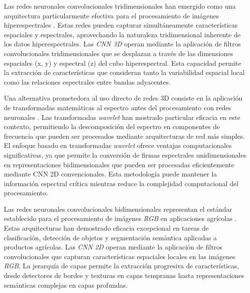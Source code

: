 \vspace{5mm}

Las redes neuronales convolucionales tridimensionales han emergido como una arquitectura particularmente efectiva para el procesamiento de imágenes hiperespectrales \cite{Zhong}. Estas redes pueden capturar simultáneamente características espaciales y espectrales, aprovechando la naturaleza tridimensional inherente de los datos hiperespectrales. Las \emph{CNN 3D} operan mediante la aplicación de filtros convolucionales tridimensionales que se desplazan a través de las dimensiones espaciales (x, y) y espectral (z) del cubo hiperespectral. Esta capacidad permite la extracción de características que consideran tanto la variabilidad espacial local como las relaciones espectrales entre bandas adyacentes.

\vspace{5mm}

Una alternativa prometedora al uso directo de redes 3D consiste en la aplicación de transformadas matemáticas al espectro antes del procesamiento con redes neuronales \cite{agriengineering6040225}. Las transformadas \emph{wavelet} han mostrado particular eficacia en este contexto, permitiendo la descomposición del espectro en componentes de frecuencia que pueden ser procesados mediante arquitecturas de red más simples. El enfoque basado en transformadas \emph{wavelet} ofrece ventajas computacionales significativas, ya que permite la conversión de firmas espectrales unidimensionales en representaciones bidimensionales que pueden ser procesadas eficientemente mediante CNN 2D convencionales. Esta metodología puede mantener la información espectral crítica mientras reduce la complejidad computacional del procesamiento.

\vspace{5mm}

\sloppy Las redes neuronales convolucionales bidimensionales representan el estándar establecido para el procesamiento de imágenes \emph{RGB} en aplicaciones agrícolas \cite{FERENTINOS2018311}. Estas arquitecturas han demostrado eficacia excepcional en tareas de clasificación, detección de objetos y segmentación semántica aplicadas a productos agrícolas. Las \emph{CNN 2D} operan mediante la aplicación de filtros convolucionales que capturan características espaciales locales en las imágenes \emph{RGB}. La jerarquía de capas permite la extracción progresiva de características, desde detectores de bordes y texturas en capas tempranas hasta representaciones semánticas complejas en capas profundas.


